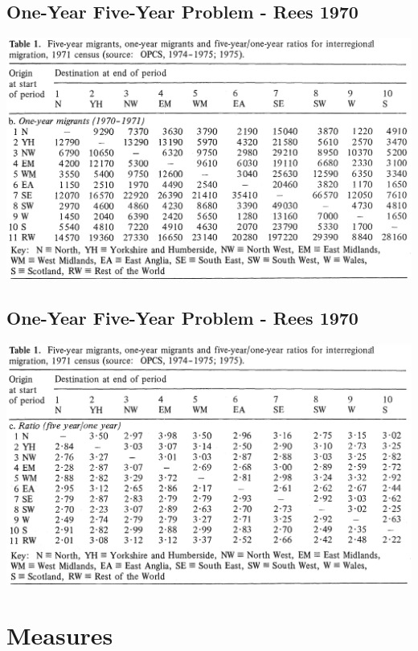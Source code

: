 \documentclass[
]{book}
\begin{document}
\hypertarget{one-year-five-year-problem---rees-1970-1}{%
\subsection{One-Year Five-Year Problem - Rees 1970}\label{one-year-five-year-problem---rees-1970-1}}

\includegraphics[width=1\linewidth]{img/rees-1977-one-five-b}

\hypertarget{one-year-five-year-problem---rees-1970-2}{%
\subsection{One-Year Five-Year Problem - Rees 1970}\label{one-year-five-year-problem---rees-1970-2}}

\includegraphics[width=1\linewidth]{img/rees-1977-one-five-c}

\hypertarget{measures}{%
\section{Measures}\label{measures}}
\end{document}
